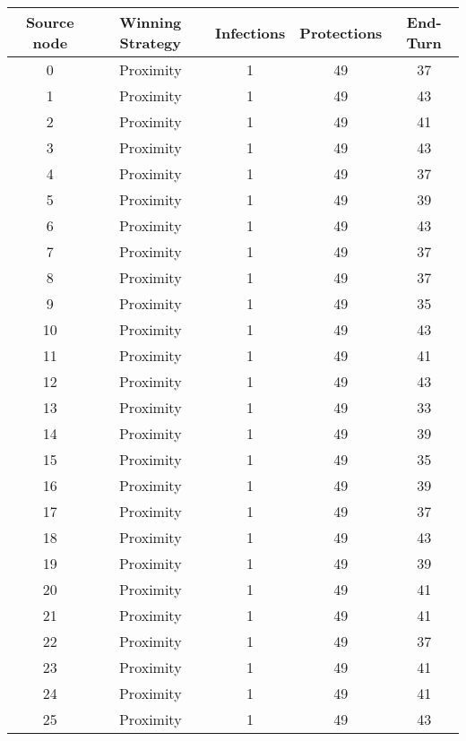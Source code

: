 \documentclass[results.tex]{subfiles}
\begin{document}
\begin{center}
  \begin{tabular}{| c || c | c | c | c |}
    \hline
    {\bfseries Source node} & {\bfseries Winning Strategy} & {\bfseries Infections} & {\bfseries Protections} & {\bfseries End-Turn} \\  %
    \hline\hline
    0 & Proximity & 1 & 49 & 37 \\ 
    \hline
    1 & Proximity & 1 & 49 & 43 \\ 
    \hline
    2 & Proximity & 1 & 49 & 41 \\ 
    \hline
    3 & Proximity & 1 & 49 & 43 \\ 
    \hline
    4 & Proximity & 1 & 49 & 37 \\ 
    \hline
    5 & Proximity & 1 & 49 & 39 \\ 
    \hline
    6 & Proximity & 1 & 49 & 43 \\ 
    \hline
    7 & Proximity & 1 & 49 & 37 \\ 
    \hline
    8 & Proximity & 1 & 49 & 37 \\ 
    \hline
    9 & Proximity & 1 & 49 & 35 \\ 
    \hline
    10 & Proximity & 1 & 49 & 43 \\ 
    \hline
    11 & Proximity & 1 & 49 & 41 \\ 
    \hline
    12 & Proximity & 1 & 49 & 43 \\ 
    \hline
    13 & Proximity & 1 & 49 & 33 \\ 
    \hline
    14 & Proximity & 1 & 49 & 39 \\ 
    \hline
    15 & Proximity & 1 & 49 & 35 \\ 
    \hline
    16 & Proximity & 1 & 49 & 39 \\ 
    \hline
    17 & Proximity & 1 & 49 & 37 \\ 
    \hline
    18 & Proximity & 1 & 49 & 43 \\ 
    \hline
    19 & Proximity & 1 & 49 & 39 \\ 
    \hline
    20 & Proximity & 1 & 49 & 41 \\ 
    \hline
    21 & Proximity & 1 & 49 & 41 \\ 
    \hline
    22 & Proximity & 1 & 49 & 37 \\ 
    \hline
    23 & Proximity & 1 & 49 & 41 \\ 
    \hline
    24 & Proximity & 1 & 49 & 41 \\ 
    \hline
    25 & Proximity & 1 & 49 & 43 \\ 

\end{tabular}
\end{center}
\end{document}
